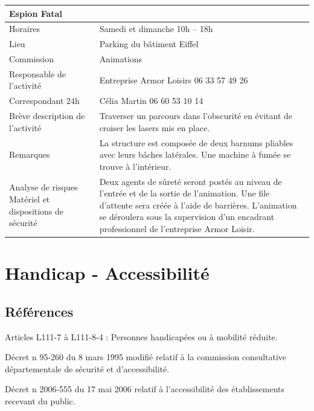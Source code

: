 \documentclass[hidelinks, paper=a4, fontsize=13pt]{report}
\begin{document}
\begin{center}
\begin{tabular}{ | p{6cm} | p{10cm} | }
\hline
	\multicolumn{2}{|l|}{Espion Fatal}  \\ \hline
	Horaires & Samedi et dimanche 10h – 18h \\ \hline
	Lieu & Parking du bâtiment Eiffel \\ \hline
	Commission & Animations \\ \hline
	Responsable de l'activité & Entreprise Armor Loisirs 06 33 57 49 26\\ \hline
	Correspondant 24h & Célia Martin 06 60 53 10 14 \\ \hline
	Brève description de l'activité & Traverser un parcours dans l’obscurité en évitant de croiser les lasers mis en place. \\ \hline
	Remarques & La structure est composée de deux barnums pliables avec leurs bâches latérales. Une machine à fumée se trouve à l’intérieur.  \\ \hline
	Analyse de risques
Matériel et dispositions de sécurité & Deux agents de sûreté seront postés au niveau de l’entrée et de la sortie de l’animation. Une file d’attente sera créée à l’aide de barrières. L'animation se déroulera sous la supervision d'un encadrant professionnel de l'entreprise Armor Loisir. \\ \hline
\end{tabular}
\end{center}



\chapter{ Handicap - Accessibilité}

\section{Références}

\begin{list}{•}{}
\item Articles L111-7 à L111-8-4 : Personnes handicapées ou à mobilité réduite.
\item Décret n  95-260 du 8 mars 1995 modifié relatif à la commission consultative départementale de sécurité et d'accessibilité.
\item Décret  n 2006-555 du 17 mai 2006 relatif à l'accessibilité des établissements recevant du public.
\end{list}
\end{document}
